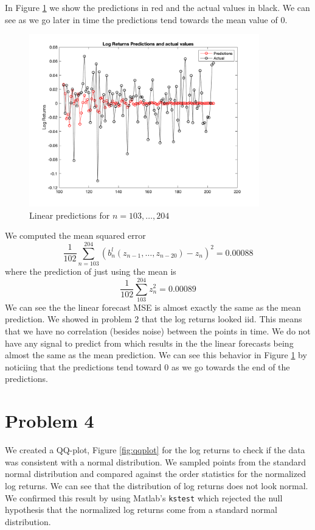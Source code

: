 \documentclass{article}
\begin{document}
In Figure \ref{fig:log_preds} we show the predictions in red and the actual values in black.
We can see as we go later in time the predictions tend towards the mean value of 0.

\begin{figure}[H]
\includegraphics[width=10cm]{plots/log_returns_preds.png}
\centering
\caption{Linear predictions for $n = 103,\ldots, 204$}
\label{fig:log_preds}
\end{figure}

We computed the mean squared error
$$
\frac{1}{102} \sum_{n = 103}^{204} (b_n^l(z_{n-1}, \ldots, z_{n - 20}) - z_n)^2 = 0.00088
$$
where the prediction of just using the mean is
$$
\frac{1}{102} \sum_{103}^{204} z_n^2 = 0.00089
$$
We can see the the linear forecast MSE is almost exactly the same as the mean prediction.
We showed in problem 2 that the log returns looked iid.
This means that we have no correlation (besides noise) between the points in time.
We do not have any signal to predict from which results in the the linear forecasts being almost the same as the mean prediction.
We can see this behavior in Figure \ref{fig:log_preds} by noticiing that the predictions tend toward 0 as we go towards the end of the predictions.

\section*{Problem 4}
We created a QQ-plot, Figure \ref{fig:qqplot} for the log returns to check if the data was consistent with a normal distribution.
We sampled points from the standard normal distribution and compared against the order statistics for the normalized log returns.
We can see that the distribution of log returns does not look normal.
We confirmed this result by using Matlab's \texttt{kstest} which rejected the null hypothesis that the normalized log returns come from a standard normal distribution.
\end{document}
